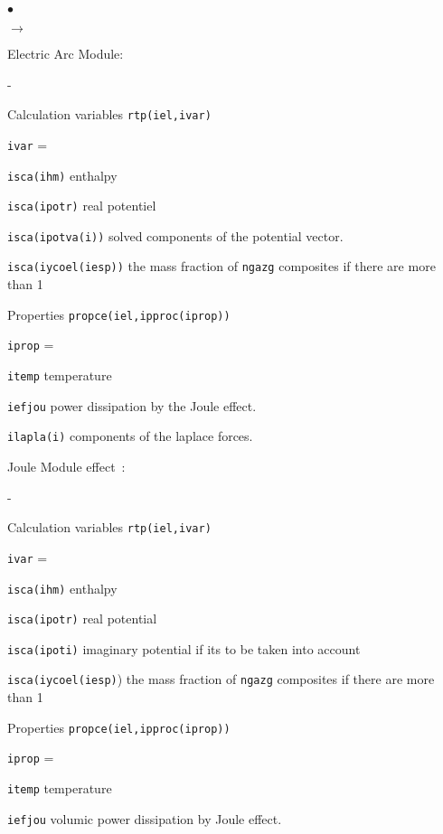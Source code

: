 {{\begin{list}{$\bullet$}{}
\begin{list}{$\rightarrow$}{}
  \item Electric Arc Module:
  \begin{list}{-}{}
     \item Calculation variables \texttt{rtp(iel,ivar)}
     \begin{list}{\texttt{ivar} = }{}
       \item \texttt{isca(ihm)} enthalpy
       \item \texttt{isca(ipotr)} real potentiel
       \item \texttt{isca(ipotva(i))} solved components of the potential vector.
       \item \texttt{isca(iycoel(iesp))} the mass fraction of \texttt{ngazg}
 composites if there are more than 1
     \end{list}
     \item Properties \texttt{propce(iel,ipproc(iprop))}
     \begin{list}{\texttt{iprop} = }{}
       \item \texttt{itemp}  temperature
       \item \texttt{iefjou} power dissipation by the Joule effect.
       \item \texttt{ilapla(i)} components of the laplace forces.
     \end{list}
   \end{list}
   \item Joule Module effect~:
   \begin{list}{-}{}
     \item Calculation variables \texttt{rtp(iel,ivar)}
     \begin{list}{\texttt{ivar} = }{}
       \item \texttt{isca(ihm)} enthalpy
       \item \texttt{isca(ipotr)} real potential
       \item \texttt{isca(ipoti)} imaginary potential if its to be taken into account
       \item \texttt{isca(iycoel(iesp)}) the mass fraction of \texttt{ngazg}
 composites if there are more than 1
     \end{list}
     \item Properties \texttt{propce(iel,ipproc(iprop))}
     \begin{list}{\texttt{iprop} = }{}
       \item \texttt{itemp} temperature
       \item \texttt{iefjou} volumic power dissipation by Joule effect.
     \end{list}
   \end{list}
\end{list}


\end{list}}}
